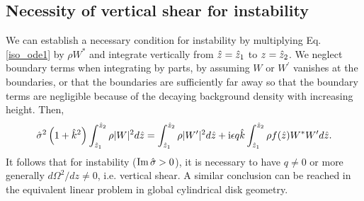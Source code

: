 \subsection{Necessity of vertical shear for
  instability}\label{integral_relation} 
We can establish a necessary condition for instability by multiplying
Eq. \ref{iso_ode1} by $\rho W^*$ and integrate vertically from
$\hat{z}=\hat{z}_1$ to $z=\hat{z}_2$. We neglect boundary 
terms when integrating by parts, by assuming $W$ or
$W^\prime$ vanishes at the boundaries, or that the boundaries are 
sufficiently far away so that the boundary terms are negligible because of the
decaying background density with increasing height. Then,
\begin{align}
  \hat{\sigma}^2\left(1+\hat{k}^2\right)\int_{\hat{z}_1}^{\hat{z}_2}\rho|W|^2d\hat{z}
  =\int_{\hat{z}_1}^{\hat{z}_2}\rho|W^\prime|^2d\hat{z} 
  +\mathrm{i} \epsilon q \hat{k}\int_{\hat{z}_1}^{\hat{z}_2}\rho f(\hat{z}) W^*W^\prime d\hat{z}.\label{integral_relation1}
\end{align}
It follows that for instability ($\operatorname{Im}\hat{\sigma}>0$), it is necessary to
have $q\neq0$ or more generally $d\Omega^2/dz\neq 0$, i.e. vertical
shear. A similar conclusion can be reached in the equivalent linear  
problem in global cylindrical disk geometry. 

